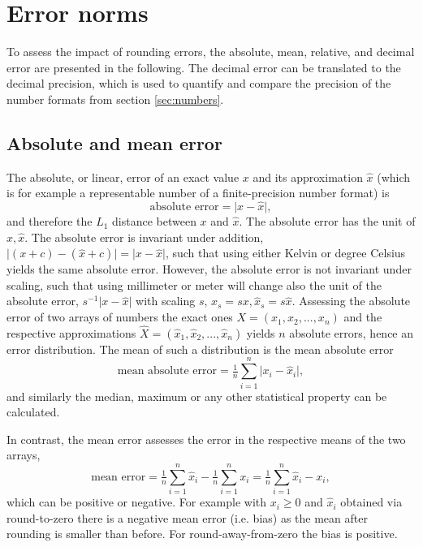 \section{Error norms}
\label{sec:error_norms}

To assess the impact of rounding errors, the absolute, mean, relative, and decimal error are presented in the following.
The decimal error can be translated to the decimal precision, which is used to quantify and compare the precision of the
number formats from section \ref{sec:numbers}. 

\subsection{Absolute and mean error}
\label{sec:absmean_error}

The absolute, or linear, error of an exact value $x$ and its approximation $\hat{x}$ (which is for example a representable number of
a finite-precision number format) is 
\begin{equation}
	\text{absolute error} = \vert x - \hat{x} \vert,
	\label{eq:abserror}
\end{equation}
and therefore the $L_1$ distance between $x$ and $\hat{x}$. The absolute error has the unit of $x,\hat{x}$. The absolute error is invariant
under addition, $\vert (x+c) - (\hat{x} + c)\vert = \vert x - \hat{x} \vert$, such that using either Kelvin or degree Celsius yields the same absolute error.
However, the absolute error is not invariant under scaling, such that using millimeter or meter will change also the unit of the absolute error,
$s^{-1}\vert x - \hat{x} \vert$ with scaling $s$, $x_s = sx, \hat{x}_s = s\hat{x}$. Assessing the absolute error of two arrays of numbers
the exact ones $X = (x_1,x_2,...,x_n)$ and the respective approximations $\hat{X} = (\hat{x}_1,\hat{x}_2,...,\hat{x}_n)$ yields $n$ 
absolute errors, hence an error distribution. The mean of such a distribution is the mean absolute error
\begin{equation}
	\text{mean absolute error} = \tfrac{1}{n} \sum_{i=1}^n \vert x_i - \hat{x}_i \vert,
	\label{eq:meanabserror}
\end{equation}
and similarly the median, maximum or any other statistical property can be calculated.

In contrast, the mean error assesses the error in the respective means of the two arrays,
\begin{equation}
	\text{mean error} = \tfrac{1}{n}\sum_{i=1}^n \hat{x}_i - \tfrac{1}{n}\sum_{i=1}^n x_i = \tfrac{1}{n} \sum_{i=1}^n \hat{x}_i - x_i,
	\label{eq:meanerror}
\end{equation}
which can be positive or negative. For example with $x_i \geq 0$ and $\hat{x}_i$ obtained via round-to-zero there is a
negative mean error (i.e. bias) as the mean after rounding is smaller than before. For round-away-from-zero the bias is
positive.

